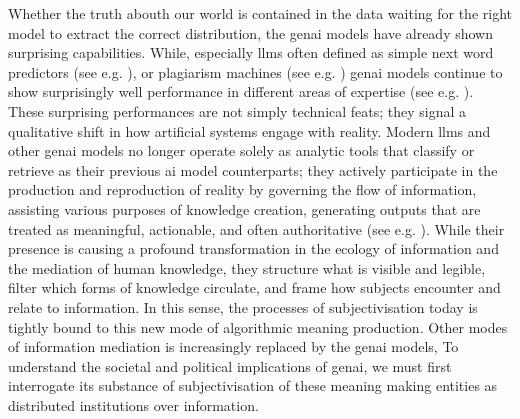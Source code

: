 \yellowsquare
Whether the truth abouth our world is contained in the data waiting for the
right model to extract the correct distribution, the \gls{genai} models have
already shown surprising capabilities. While, especially \glspl{llm} often
defined as simple next word predictors (see e.g. \cite[]{dalvi2025}), or
plagiarism machines (see e.g. \cite[]{chomsky2023}) \gls{genai} models continue to
show surprisingly well performance in different areas of expertise (see e.g. \cite[]{sultanow2024}). These surprising performances are not simply technical feats; they signal a qualitative shift in how artificial systems engage with reality. Modern \glspl{llm}  and other \gls{genai} models no longer operate solely as analytic tools that classify or retrieve as their previous \gls{ai} model counterparts; they actively participate in the production and reproduction of reality by governing the flow of information, assisting various purposes of knowledge creation, generating outputs that are treated as meaningful, actionable, and often authoritative (see e.g. \cite{montanari2025, dishon2024}). While their presence is causing a profound transformation in the ecology of information and the mediation of human knowledge, they structure what is visible and legible, filter which forms of knowledge circulate, and frame how subjects encounter and relate to information. In this sense, the processes of subjectivisation today is tightly bound to this new mode of algorithmic meaning production. Other modes of information mediation is increasingly replaced by the \gls{genai} models, To understand the societal and political implications of \gls{genai}, we must first interrogate its substance of subjectivisation of these meaning making entities as distributed institutions over information.


